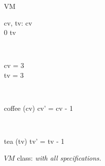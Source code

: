 \begin{figure}[H]
\centering
\begin{class}{VM}
\\
\begin{state}
cv, tv: \integer
{} \leq  cv 
\\
0 \leq  tv 
\end{state} 
\\
\begin{init}
cv = 3
\\tv = 3
\end{init} 
\\
\begin{op}{coffee}
\Delta (cv)
\ST
cv' = cv - 1
\end{op}
\\
\begin{op}{tea}
\Delta (tv)
\ST
tv' = tv - 1
\end{op}
\end{class}
\caption{$VM$ class: \textit{with all specifications.}}
\label{oz_vm_with_all_specifications}
\end{figure}